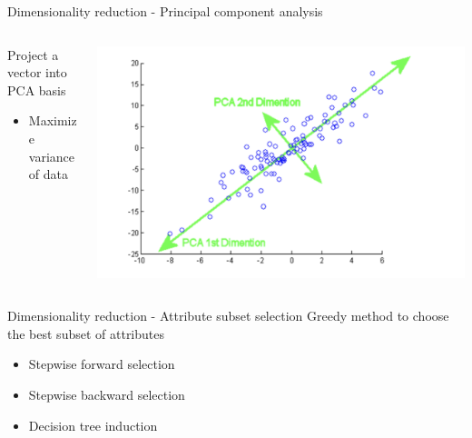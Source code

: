 \begin{frame}{Dimensionality reduction - Principal component analysis}
    \begin{columns}
    \begin{column}{0.5\textwidth}
        Project a vector into PCA basis
        \begin{itemize}
            \item Maximize variance of data
        \end{itemize}
    \end{column}
    \begin{column}{0.5\textwidth}
        \begin{center}
            \includegraphics[width=1.0\textwidth]{assets/pca.png}
        \end{center}
    \end{column}
    \end{columns}
\end{frame}

\begin{frame}{Dimensionality reduction - Attribute subset selection}
    Greedy method to choose the best subset of attributes
    \begin{itemize}
        \item Stepwise forward selection
        \item Stepwise backward selection
        \item Decision tree induction
    \end{itemize}
\end{frame}

